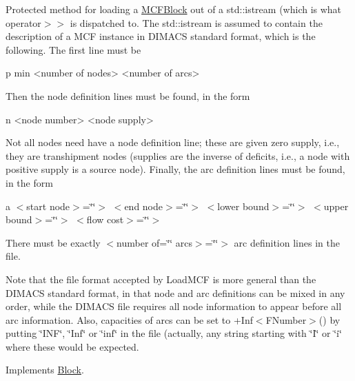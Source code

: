 Protected method for loading a \mbox{\hyperlink{class_s_m_spp__di__unipi__it_1_1_m_c_f_block}{M\+C\+F\+Block}} out of a std\+::istream (which is what operator$>$$>$ is dispatched to. The std\+::istream is assumed to contain the description of a M\+CF instance in D\+I\+M\+A\+CS standard format, which is the following. The first line must be \begin{DoxyVerb} p min <number of nodes> <number of arcs>
\end{DoxyVerb}


Then the node definition lines must be found, in the form \begin{DoxyVerb} n <node number> <node supply>
\end{DoxyVerb}


Not all nodes need have a node definition line; these are given zero supply, i.\+e., they are transhipment nodes (supplies are the inverse of deficits, i.\+e., a node with positive supply is a source node). Finally, the arc definition lines must be found, in the form

a $<$start node$>$=\char`\"{}\char`\"{}$>$ $<$end node$>$=\char`\"{}\char`\"{}$>$ $<$lower bound$>$=\char`\"{}\char`\"{}$>$ $<$upper bound$>$=\char`\"{}\char`\"{}$>$ $<$flow cost$>$=\char`\"{}\char`\"{}$>$

There must be exactly $<$number of=\char`\"{}\char`\"{} arcs$>$=\char`\"{}\char`\"{}$>$ arc definition lines in the file.

Note that the file format accepted by Load\+M\+CF is more general than the D\+I\+M\+A\+CS standard format, in that node and arc definitions can be mixed in any order, while the D\+I\+M\+A\+CS file requires all node information to appear before all arc information. Also, capacities of arcs can be set to +\+Inf$<$\+F\+Number$>$() by putting \char`\"{}\+I\+N\+F\char`\"{}, \char`\"{}\+Inf\char`\"{} or \char`\"{}inf\char`\"{} in the file (actually, any string starting with \char`\"{}\+I\char`\"{} or \char`\"{}i\char`\"{} where these would be expected. 

Implements \mbox{\hyperlink{class_s_m_spp__di__unipi__it_1_1_block_a27ae9e4279482d52342c7958c34a43c6}{Block}}.

\mbox{\label{class_s_m_spp__di__unipi__it_1_1_m_c_f_block_a80212ada24a69dc8a0590eb82b5ef7c4}} 
